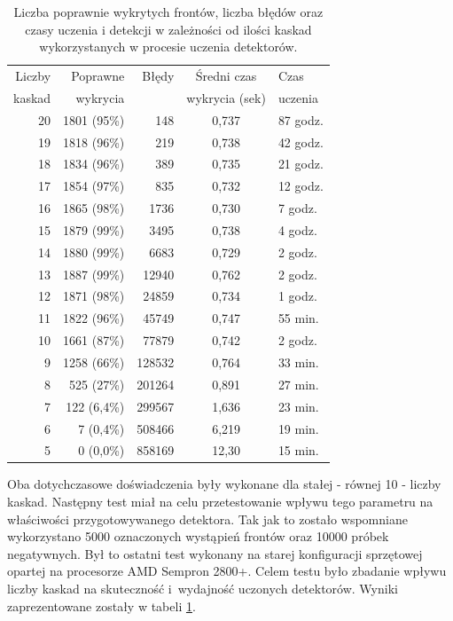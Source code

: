 \begin{table}[!h]
	\centering                                                          
	\caption{Liczba poprawnie wykrytych frontów, liczba błędów oraz czasy uczenia 
		i detekcji w zależności od ilości kaskad wykorzystanych w procesie uczenia 
		detektorów.}
	\begin{tabular}{r|r|r|c|l}
		Liczby    & Poprawne     & Błędy  & Średni czas    & Czas     \\
		kaskad    & wykrycia     &        & wykrycia (sek) & uczenia  \\
		\hline
		20        & 1801 (95\%)  & 148    & 0,737   & 87 godz.\\
		19        & 1818 (96\%)  & 219    & 0,738   & 42 godz.\\
		18        & 1834 (96\%)  & 389    & 0,735   & 21 godz.\\
		17        & 1854 (97\%)  & 835    & 0,732   & 12 godz.\\
		16        & 1865 (98\%)  & 1736   & 0,730   & 7 godz. \\
		15        & 1879 (99\%)  & 3495   & 0,738   & 4 godz. \\
		14        & 1880 (99\%)  & 6683   & 0,729   & 2 godz. \\
		13        & 1887 (99\%)  & 12940  & 0,762   & 2 godz. \\
		12        & 1871 (98\%)  & 24859  & 0,734   & 1 godz. \\
		11        & 1822 (96\%)  & 45749  & 0,747   & 55 min. \\
		10        & 1661 (87\%)  & 77879  & 0,742   & 2 godz. \\
		9         & 1258 (66\%)  & 128532 & 0,764   & 33 min. \\
		8         & 525  (27\%)  & 201264 & 0,891   & 27 min. \\
		7         & 122  (6,4\%) & 299567 & 1,636   & 23 min. \\
		6         & 7    (0,4\%) & 508466 & 6,219   & 19 min. \\
		5         & 0    (0,0\%) & 858169 & 12,30   & 15 min. \\
	\end{tabular} 
	\label{tab:cascade_2_effi}
\end{table}

Oba dotychczasowe doświadczenia były wykonane dla stałej - równej 10 - liczby kaskad.
Następny test miał na celu przetestowanie wpływu tego parametru na właściwości
przygotowywanego detektora. Tak jak to zostało wspomniane wykorzystano 5000 oznaczonych 
wystąpień frontów oraz
10000 próbek negatywnych. Był to ostatni test wykonany na starej konfiguracji sprzętowej
opartej na procesorze AMD Sempron 2800+. Celem testu było zbadanie wpływu liczby kaskad
na skuteczność i~wydajność uczonych detektorów. Wyniki zaprezentowane zostały w tabeli 
\ref{tab:cascade_2_effi}.

